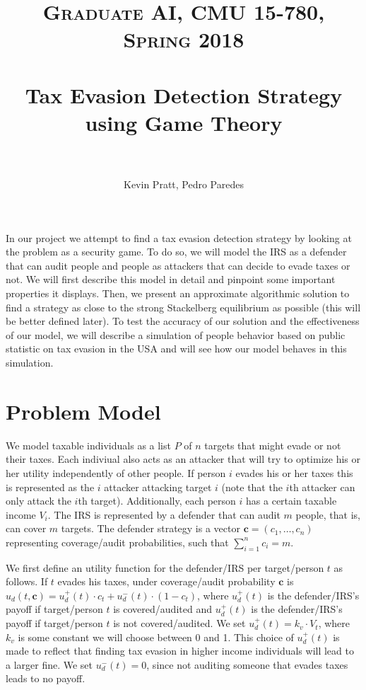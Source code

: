 \documentclass[paper=letter, fontsize=11pt]{article}
\title{
  \normalfont \normalsize
  \textsc{Graduate AI, CMU 15-780, Spring 2018} \\ [25pt]
  \horrule{0.5pt} \\[0.4cm]
  \huge Tax Evasion Detection Strategy using Game Theory \\
  \horrule{2pt} \\[0.5cm]
}
\author{Kevin Pratt, Pedro Paredes}
\date{}
\begin{document}
\maketitle
\thispagestyle{firstpage}

In our project we attempt to find a tax evasion detection strategy by
looking at the problem as a security game. To do so, we will model the
IRS as a defender that can audit people and people as attackers that
can decide to evade taxes or not. We will first describe this model in
detail and pinpoint some important properties it displays. Then, we
present an approximate algorithmic solution to find a strategy as
close to the strong Stackelberg equilibrium as possible (this will be
better defined later). To test the accuracy of our solution and the
effectiveness of our model, we will describe a simulation of people
behavior based on public statistic on tax evasion in the USA and will
see how our model behaves in this simulation.

\section*{Problem Model}

We model taxable individuals as a list $P$ of $n$ targets that might
evade or not their taxes. Each indiviual also acts as an attacker that
will try to optimize his or her utility independently of other
people. If person $i$ evades his or her taxes this is represented as
the $i$ attacker attacking target $i$ (note that the $i$th attacker
can only attack the $i$th target). Additionally, each person $i$ has a
certain taxable income $V_i$. The IRS is represented by a defender
that can audit $m$ people, that is, can cover $m$ targets. The
defender strategy is a vector $\bm{c} = (c_1, \ldots, c_n)$
representing coverage/audit probabilities, such that
$\sum_{i = 1}^n c_i = m$.

We first define an utility function for the defender/IRS per
target/person $t$ as follows. If $t$ evades his taxes, under
coverage/audit probability $\bm{c}$ is
$u_d(t, \bm{c}) = u_d^+(t) \cdot c_t + u_d^-(t) \cdot (1 - c_t)$,
where $u_d^+(t)$ is the defender/IRS's payoff if target/person $t$ is
covered/audited and $u_d^+(t)$ is the defender/IRS's payoff if
target/person $t$ is not covered/audited. We set
$u_d^+(t) = k_v \cdot V_t$, where $k_v$ is some constant we will
choose between 0 and 1. This choice of $u_d^+(t)$ is made to reflect
that finding tax evasion in higher income individuals will lead to a
larger fine. We set $u_d^-(t) = 0$, since not auditing someone that
evades taxes leads to no payoff.
\end{document}
